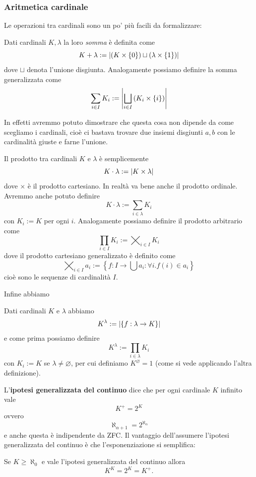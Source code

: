 \documentclass[11pt]{scrartcl}
\newcommand{\eset}{\varnothing}
\begin{document}
 	\subsubsection{Aritmetica cardinale}
 	Le operazioni tra cardinali sono un po' più facili da formalizzare:
 	\begin{definition}
 		Dati cardinali $K,\lambda$ la loro \textit{somma} è definita come
 		$$K+\lambda:=\left\lvert \left(K\times \left\{0\right\}\right)\sqcup \left(\lambda\times \left\{1\right\}\right) \right\rvert$$
 		dove $\sqcup$ denota l'unione disgiunta. Analogamente possiamo definire la somma generalizzata come
 		$$\sum_{i\in I} K_i :=\left\lvert \bigsqcup_{i\in I}\left(K_i\times \left\{i\right\}\right) \right\rvert$$
 	\end{definition}
 	In effetti avremmo potuto dimostrare che questa cosa non dipende da come scegliamo i cardinali, cioè ci bastava trovare due insiemi disgiunti $a,b$ con le cardinalità giuste e farne l'unione.
 	\begin{definition}
 		Il prodotto tra cardinali $K$ e $\lambda$ è semplicemente
 		$$K\cdot\lambda:=\left\lvert K\times \lambda \right\rvert$$
 		dove $\times$ è il prodotto cartesiano. In realtà va bene anche il prodotto ordinale. Avremmo anche potuto definire
 		$$K\cdot \lambda:=\sum_{i\in \lambda}K_i$$
 		con $K_i:=K$ per ogni $i$. Analogamente possiamo definire il prodotto arbitrario come
 		$$\prod_{i\in I}K_i:=\bigtimes_{i\in I}K_i$$
 		dove il prodotto cartesiano generalizzato è definito come
 		$$\bigtimes_{i\in I}a_i:=\left\{f:I\to \bigcup a_i:\forall i .f(i)\in a_i\right\}$$
 		cioè sono le sequenze di cardinalità $I$.
 	\end{definition}
 	Infine abbiamo
 	\begin{definition}
 		Dati cardinali $K$ e $\lambda$ abbiamo 
 		$$K^\lambda:=\left\lvert \left\{f:\lambda\to K\right\} \right\rvert$$
 		e come prima possiamo definire 
 		$$K^\lambda:=\prod_{i\in \lambda}K_i$$
 		con $K_i:=K$ se $\lambda\ne \eset$, per cui definiamo $K^\eset=1$ (come si vede applicando l'altra definizione).
 	\end{definition}
 	L'\textbf{ipotesi generalizzata del continuo} dice che per ogni cardinale $K$ infinito vale 
 	$$K^+=2^K$$
 	ovvero
 	$$\aleph_{\alpha+1}=2^{\aleph_\alpha}$$ 
 	e anche questa è indipendente da ZFC. Il vantaggio dell'assumere l'ipotesi generalizzata del continuo è che l'esponenziazione si semplifica:
 	\begin{proposition}
 		Se $K\ge \aleph_0$ e vale l'ipotesi generalizzata del continuo allora
 		$$K^K=2^K=K^+.$$
 	\end{proposition}
\end{document}
